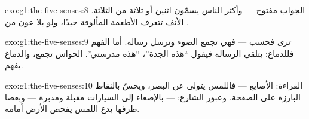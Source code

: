 \begin{solution}{exo:g1:the-five-senses:8}
الجواب مفتوح --- وأكثر الناس يسمّون اثنين أو ثلاثة من الثلاثة.
الأنف تتعرف الأطعمة المألوفة جيدًا، ولو بلا عون من .
\end{solution}

\begin{solution}{exo:g1:the-five-senses:9}
 \emph{ترى} فحسب --- فهي تجمع الضوء وترسل رسالة. أما الفهم
فللدماغ: يتلقى الرسالة فيقول ``هذه الجدة''، ``هذه مدرستي''.
الحواس تجمع، والدماغ يفهم.
\end{solution}

\begin{solution}{exo:g1:the-five-senses:10}
القراءة:  الأصابع --- فاللمس يتولى عن البصر، ويحسّ بالنقاط
البارزة على الصفحة. وعبور الشارع:  --- بالإصغاء إلى
السيارات مقبلة ومدبرة --- وبعصا طرفها يدع اللمس يفحص الأرض أمامه.
\end{solution}
